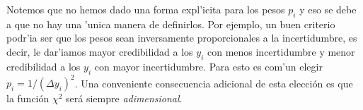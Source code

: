 
Notemos que no hemos dado una forma expl'icita para los pesos $p_i$ y eso se debe a que no hay una 'unica manera de definirlos. Por ejemplo, un buen criterio podr'ia ser que los pesos sean inversamente proporcionales a la incertidumbre, es decir, le dar'iamos mayor credibilidad a los $y_{i}$ con menos incertidumbre y menor credibilidad a los $y_{i}$ con mayor incertidumbre. Para esto es com'un elegir $p_i=1/(\Delta y_{i})^2$. Una conveniente consecuencia adicional de esta elección es que la función $\chi^2$ será siempre \textit{adimensional}.

